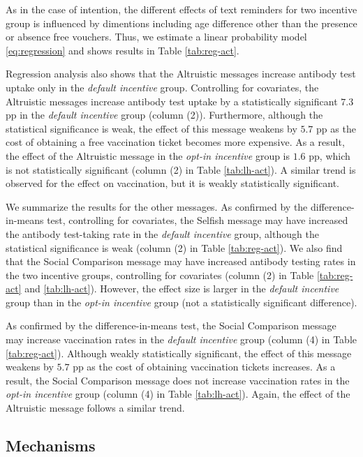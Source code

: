 \documentclass[
]{article}
\begin{document}
As in the case of intention, the different effects of text reminders for two incentive group is influenced by dimentions including age difference other than the presence or absence free vouchers. Thus, we estimate a linear probability model \eqref{eq:regression} and shows results in Table \ref{tab:reg-act}.

Regression analysis also shows that the Altruistic messages increase antibody test uptake only in the \emph{default incentive} group. Controlling for covariates, the Altruistic messages increase antibody test uptake by a statistically significant \(7.3\) pp in the \emph{default incentive} group (column (2)). Furthermore, although the statistical significance is weak, the effect of this message weakens by \(5.7\) pp as the cost of obtaining a free vaccination ticket becomes more expensive. As a result, the effect of the Altruistic message in the \emph{opt-in incentive} group is \(1.6\) pp, which is not statistically significant (column (2) in Table \ref{tab:lh-act}). A similar trend is observed for the effect on vaccination, but it is weakly statistically significant.

We summarize the results for the other messages. As confirmed by the difference-in-means test, controlling for covariates, the Selfish message may have increased the antibody test-taking rate in the \emph{default incentive} group, although the statistical significance is weak (column (2) in Table \ref{tab:reg-act}). We also find that the Social Comparison message may have increased antibody testing rates in the two incentive groups, controlling for covariates (column (2) in Table \ref{tab:reg-act} and \ref{tab:lh-act}). However, the effect size is larger in the \emph{default incentive} group than in the \emph{opt-in incentive} group (not a statistically significant difference).

As confirmed by the difference-in-means test, the Social Comparison message may increase vaccination rates in the \emph{default incentive} group (column (4) in Table \ref{tab:reg-act}). Although weakly statistically significant, the effect of this message weakens by \(5.7\) pp as the cost of obtaining vaccination tickets increases. As a result, the Social Comparison message does not increase vaccination rates in the \emph{opt-in incentive} group (column (4) in Table \ref{tab:lh-act}). Again, the effect of the Altruistic message follows a similar trend.

\hypertarget{mechanisms}{%
\subsection{Mechanisms}\label{mechanisms}}
\end{document}
